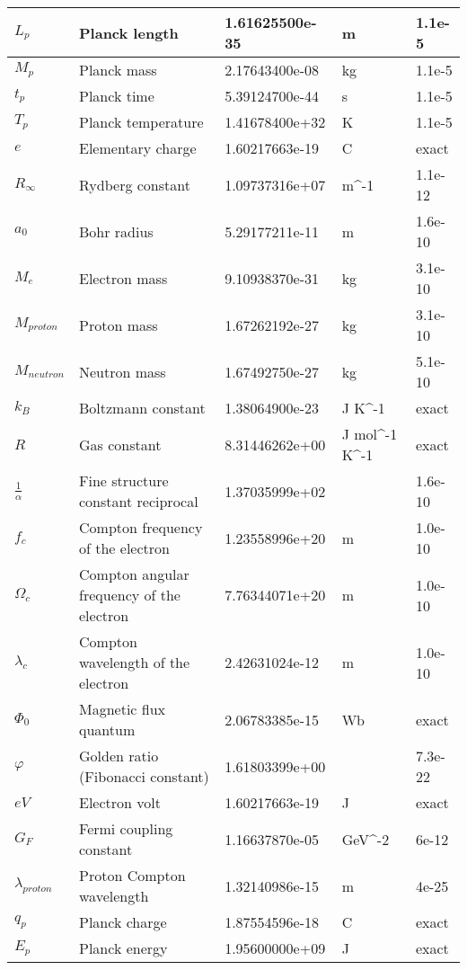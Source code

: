 \documentclass{article}%
\begin{document}
\begin{table}[H]
\begin{tabular}{|l|l|l|l|l|}
$L_p$ & Planck length & 1.61625500e-35 & m & 1.1e-5 \\ \hline%
$M_p$ & Planck mass & 2.17643400e-08 & kg & 1.1e-5 \\ \hline%
$t_p$ & Planck time & 5.39124700e-44 & s & 1.1e-5 \\ \hline%
$T_p$ & Planck temperature & 1.41678400e+32 & K & 1.1e-5 \\ \hline%
$e$ & Elementary charge & 1.60217663e-19 & C & exact \\ \hline%
$R_\infty$ & Rydberg constant & 1.09737316e+07 & m^-1 & 1.1e-12 \\ \hline%
$a_0$ & Bohr radius & 5.29177211e-11 & m & 1.6e-10 \\ \hline%
$M_e$ & Electron mass & 9.10938370e-31 & kg & 3.1e-10 \\ \hline%
$M_{proton}$ & Proton mass & 1.67262192e-27 & kg & 3.1e-10 \\ \hline%
$M_{neutron}$ & Neutron mass & 1.67492750e-27 & kg & 5.1e-10 \\ \hline%
$k_B$ & Boltzmann constant & 1.38064900e-23 & J K^-1 & exact \\ \hline%
$R$ & Gas constant & 8.31446262e+00 & J mol^-1 K^-1 & exact \\ \hline%
$\frac{1}{\alpha}$ & Fine structure constant reciprocal & 1.37035999e+02 &  & 1.6e-10 \\ \hline%
$f_c$ & Compton frequency of the electron & 1.23558996e+20 & m & 1.0e-10 \\ \hline%
$\Omega_c$ & Compton angular frequency of the electron & 7.76344071e+20 & m & 1.0e-10 \\ \hline%
$\lambda_c$ & Compton wavelength of the electron & 2.42631024e-12 & m & 1.0e-10 \\ \hline%
$\Phi_0$ & Magnetic flux quantum & 2.06783385e-15 & Wb & exact \\ \hline%
$\varphi$ & Golden ratio (Fibonacci constant) & 1.61803399e+00 &  & 7.3e-22 \\ \hline%
$eV$ & Electron volt & 1.60217663e-19 & J & exact \\ \hline%
$G_F$ & Fermi coupling constant & 1.16637870e-05 & GeV^-2 & 6e-12 \\ \hline%
$\lambda_{proton}$ & Proton Compton wavelength & 1.32140986e-15 & m & 4e-25 \\ \hline%
$q_p$ & Planck charge & 1.87554596e-18 & C & exact \\ \hline%
$E_p$ & Planck energy & 1.95600000e+09 & J & exact \\ \hline%

\end{tabular}
\end{table}
\end{document}
